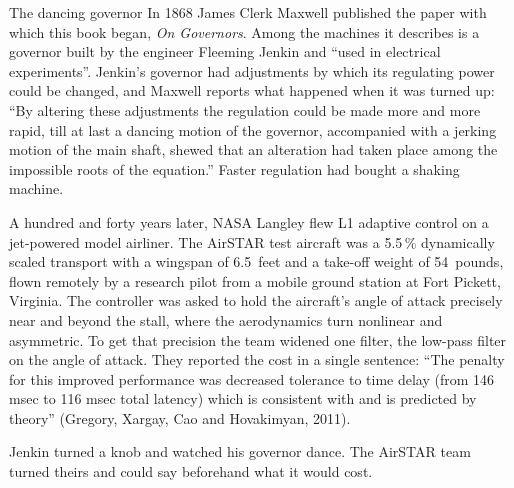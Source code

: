 \begin{curiosity}{The dancing governor}
In 1868 James Clerk Maxwell published the paper with which this book began, \emph{On Governors}. Among the machines it describes is a governor built by the engineer Fleeming Jenkin and \enquote{used in electrical experiments}. Jenkin's governor had adjustments by which its regulating power could be changed, and Maxwell reports what happened when it was turned up: \enquote{By altering these adjustments the regulation could be made more and more rapid, till at last a dancing motion of the governor, accompanied with a jerking motion of the main shaft, shewed that an alteration had taken place among the impossible roots of the equation.} Faster regulation had bought a shaking machine.

A hundred and forty years later, NASA Langley flew L1 adaptive control on a jet-powered model airliner. The AirSTAR test aircraft was a 5.5\,\% dynamically scaled transport with a wingspan of 6.5~feet and a take-off weight of 54~pounds, flown remotely by a research pilot from a mobile ground station at Fort Pickett, Virginia. The controller was asked to hold the aircraft's angle of attack precisely near and beyond the stall, where the aerodynamics turn nonlinear and asymmetric. To get that precision the team widened one filter, the low-pass filter on the angle of attack. They reported the cost in a single sentence: \enquote{The penalty for this improved performance was decreased tolerance to time delay (from 146 msec to 116 msec total latency) which is consistent with and is predicted by theory} (Gregory, Xargay, Cao and Hovakimyan, 2011).

Jenkin turned a knob and watched his governor dance. The AirSTAR team turned theirs and could say beforehand what it would cost.
\end{curiosity}

